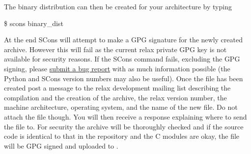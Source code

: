 
The binary distribution can then be created for your architecture by typing

\begin{exampleenv}
\$ scons binary\_dist
\end{exampleenv}

At the end SCons will attempt to make a GPG signature for the newly created archive.
However this will fail as the current relax private GPG key is not available for security reasons.
If the SCons command fails, excluding the GPG signing, please \href{\relaxBugTrackerSubmitURL}{submit a bug report} with as much information possible (the Python and SCons version numbers may also be useful).
Once the file has been created post a message to the relax development mailing list describing the compilation and the creation of the archive, the relax version number, the machine architecture, operating system, and the name of the new file.
Do not attach the file though.
You will then receive a response explaining where to send the file to.
For security the archive will be thoroughly checked and if the source code is identical to that in the repository and the C modules are okay, the file will be GPG signed and uploaded to \href{\relaxDistributionURL}{\relaxDistributionURL}.

